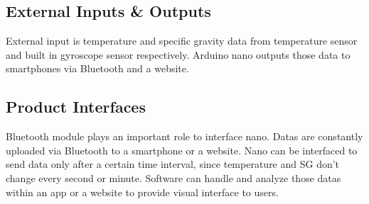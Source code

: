 \subsection{External Inputs \& Outputs}
External input is temperature and specific gravity data from temperature sensor and built in gyroscope sensor respectively. Arduino nano outputs those data to smartphones via Bluetooth and a website.

\subsection{Product Interfaces}
Bluetooth module plays an important role to interface nano. Datas are constantly uploaded via Bluetooth to a smartphone or a website. Nano can be interfaced  to send data only after a certain time interval, since temperature and SG don't change every second or minute. Software can handle and analyze those datas within an app or a website to provide visual interface to users.
